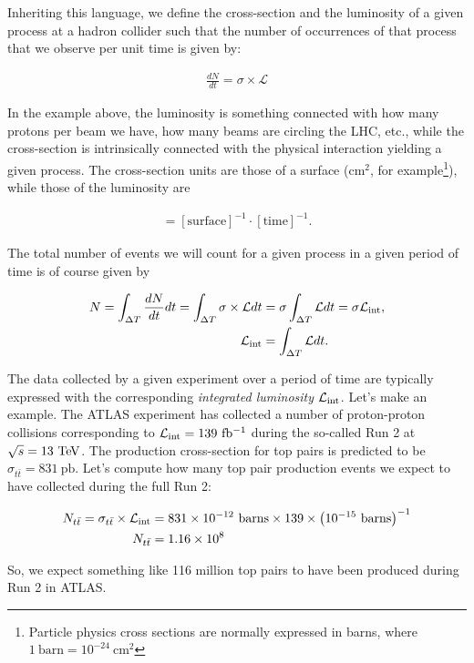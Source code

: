 Inheriting this language, we define the cross-section and the luminosity of a given process at a hadron collider such that the number of occurrences of that process that we observe per unit time is given by: 

\begin{align*}
\frac{dN}{dt} = \sigma \times \mathcal{L}
\end{align*} 

In the example above, the luminosity is something connected with how many protons per beam we have, how many beams are circling the LHC, etc., while the cross-section is intrinsically connected with the physical interaction yielding a given process. The cross-section units are those of a surface (cm$^2$, for example\footnote{Particle physics cross sections are normally expressed in barns, where $1\ \mathrm{barn} = 10^{-24}\ \mathrm{cm}^2$}), while those of the luminosity are

\begin{align*}
[\mathcal{L}] =  [\mathrm{surface}]^{-1}\cdot [\mathrm{time}]^{-1}.
\end{align*}

The total number of events we will count for a given process in a given period of time is of course given by 

\begin{align}
N = \int_{\Delta T} \frac{dN}{dt} dt = \int_{\Delta T} \sigma \times \mathcal{L} dt &= \sigma \int_{\Delta T} \mathcal{L} dt = \sigma \mathcal{L}_{\mathrm{int}}, \\ 
\mathcal{L}_{\mathrm{int}} &= \int_{\Delta T} \mathcal{L} dt.
\end{align}

The data collected by a given experiment over a period of time are typically expressed with the corresponding \textit{integrated luminosity} $\mathcal{L}_{\mathrm{int}}$. Let's make an example. The ATLAS experiment has collected a number of proton-proton collisions corresponding to $\Lint = 139\ \ifb$ during the so-called Run 2 at $\sqrt{s} = 13\ \text{Te\kern -0.1em V}$. The production cross-section for top pairs is predicted to be $\sigma_{t\bar{t}} = 831\ \mathrm{pb}$. Let's compute how many top pair production events we expect to have collected during the full Run 2: 

\begin{align*}
N_{t\bar{t}} = \sigma_{t\bar{t}} \times \Lint &= 831 \times 10^{-12} \ \mathrm{barns} \times 139 \times \left(10^{-15}\ \mathrm{barns}\right)^{-1} \\
N_{t\bar{t}} &= 1.16\times 10^{8}
\end{align*}

So, we expect something like 116 million top pairs to have been produced during Run 2 in ATLAS.




